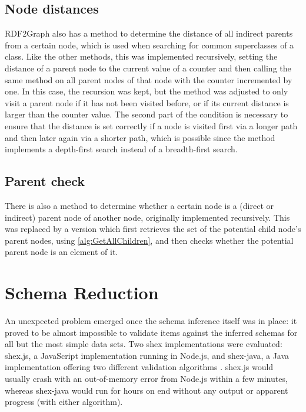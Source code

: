 \subsection{Node distances}
\label{subsec:RDF2Graph+Wikidata:cyclic-graph:distance}

\Gls{RDF2Graph} also has a method to determine the distance of all indirect parents from a certain node,
which is used when searching for common superclasses of a class.
Like the other methods, this was implemented recursively,
setting the distance of a parent node to the current value of a counter
and then calling the same method on all parent nodes of that node with the counter incremented by one.
In this case, the recursion was kept,
but the method was adjusted to only visit a parent node
if it has not been visited before, or if its current distance is larger than the counter value.
The second part of the condition is necessary to ensure that the distance is set correctly
if a node is visited first via a longer path and then later again via a shorter path,
which is possible since the method implements a depth-first search instead of a breadth-first search.

\subsection{Parent check}
\label{subsec:RDF2Graph+Wikidata:cyclic-graph:IsParent}

There is also a method to determine whether a certain node is a (direct or indirect) parent node of another node,
originally implemented recursively.
This was replaced by a version which first retrieves the set of the potential child node’s parent nodes,
using \cref{alg:GetAllChildren},
and then checks whether the potential parent node is an element of it.

\section{Schema Reduction}
\label{sec:RDF2Graph+Wikidata:schema-reduction}

An unexpected problem emerged once the \gls{schema} inference itself was in place: %
it proved to be almost impossible to validate \glspl{item} against the inferred \glspl{schema}
for all but the most simple data sets.
Two \gls{shex} implementations were evaluated:
shex.js,
a \gls{JavaScript} implementation running in \gls{Node.js},
and shex-java,
a Java implementation offering two different validation algorithms \cite{boneva:hal-01590350}.
shex.js would usually crash with an out-of-memory error from \gls{Node.js} within a few minutes,
whereas shex-java would run for hours on end without any output or apparent progress
(with either algorithm).

